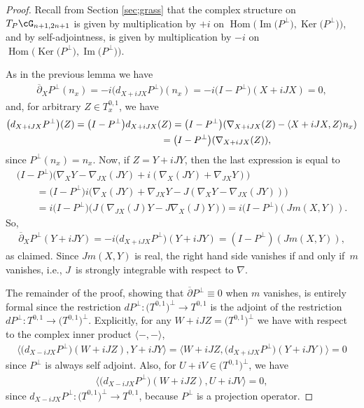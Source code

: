 \begin{proof}Recall from Section \ref{sec;grass} that the complex structure on $T_P \cG_{n+1,2n+1}$ is given by multiplication by $+i$ on $\operatorname{Hom}\big(\operatorname{Im}\big(P^\perp\big), \operatorname{Ker}\big(P^\perp\big)\big)$, and by self-adjointness, is given by multiplication by $-i$ on $\operatorname{Hom}\big(\operatorname{Ker}\big(P^\perp\big),\operatorname{Im}\big(P^\perp\big)\big)$.

As in the previous lemma we have
\begin{gather*}
 \overline{\partial}_X P^\perp (n_x) = -i \big( d_{X+iJX} P^\perp \big) (n_x) = -i \big(I-P^\perp\big)(X+iJX) = 0,
\end{gather*}
and, for arbitrary $Z \in T^{0,1}_x$, we have
\begin{gather*}
\big( d_{X+iJX} P^\perp \big) (Z) = \big(I-P^\perp\big) d_{X+iJX} (Z)= \big(I-P^\perp\big) ( \nabla_{X+iJX} (Z) - \langle X+iJX, Z \rangle n_x ) \\
\hphantom{\big( d_{X+iJX} P^\perp \big) (Z)}{} = \big(I-P^\perp\big) ( \nabla_{X+iJX} (Z) ),
 \end{gather*}
 since $P^\perp(n_x) = n_x$. Now, if $Z= Y+iJY$, then the last expression is equal to
 \begin{gather*}
 \big(I -P^\perp\big) \big( \nabla_X Y - \nabla_{JX} (JY) + i ( \nabla_X(JY) + \nabla_{JX} Y ) \big) \\
 \qquad{} = \big(I -P^\perp\big) i \big( \nabla_X(JY) + \nabla_{JX} Y - J(\nabla_X Y - \nabla_{JX} (JY)) \big) \\
 \qquad {}= i \big(I -P^\perp\big) \big( J ( \nabla_{JX} (J) Y - J\nabla_X(J) Y ) \big) = i \big(I - P^\perp\big) ( J m(X,Y) ).
\end{gather*}
 So,
\begin{gather*}
\overline{\partial}_X P^\perp (Y+iJY) = -i \big( d_{X+iJX} P^\perp \big) (Y + iJY) = ( I - P^\perp) ( J m(X,Y) ),
\end{gather*}
as claimed. Since $ J m(X,Y)$ is real, the right hand side vanishes if and only if~$m$ vanishes, i.e., $J $~is strongly integrable with respect to $\nabla$.

The remainder of the proof, showing that $\overline{\partial} P^\perp \equiv 0$ when $m$ vanishes, is entirely formal since the restriction $dP^\perp\colon \big(T^{0,1}\big)^\perp \to T^{0,1}$ is the adjoint of the restriction $dP^\perp\colon T^{0,1} \to \big(T^{0,1}\big)^\perp$. Explicitly, for any $W + i JZ = \big(T^{0,1}\big)^\perp$ we have with respect to the complex inner product $\langle - , - \rangle$,
\begin{gather*}
\big\langle \big( d_{X-iJX} P^\perp \big) (W+iJZ) , Y+i JY \big\rangle
= \big\langle W+iJZ , \big( d_{X+iJX} P^\perp \big)( Y+i JY )\big\rangle = 0
\end{gather*}
since $P^\perp$ is always self adjoint. Also, for $U + iV \in \big(T^{0,1}\big)^\perp$, we have
\begin{gather*}
\big\langle \big( d_{X-iJX} P^\perp \big) (W+iJZ) , U+iJV \big\rangle = 0,
\end{gather*}
since $d_{X-iJX} P^\perp \colon \big(T^{0,1}\big)^\perp \to T^{0,1}$, because $P^\perp$ is a projection operator.
\end{proof}

